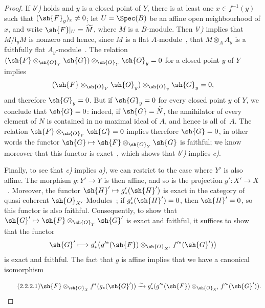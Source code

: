 \begin{proof}
If \emph{b$'$)} holds and $y$ is a closed point of $Y$, there is at least one $x\in f^{-1}(y)$ such that $(\sh{F}_y)_x\neq 0$; let $U=\Spec(B)$ be an affine open neighbourhood of $x$, and write $\sh{F}|_U=\widetilde{M}$, where $M$ is a $B$-module.
Then \emph{b$'$)} implies that $M/\mathfrak{i}_yM$ is nonzero and hence, since $M$ is a flat $A$-module~, that $M\otimes_A A_y$ is a faithfully flat $A_y$-module~.
The relation $(\sh{F}\otimes_{\sh{O}_Y}\sh{G})\otimes_{\sh{O}_Y}\sh{O}_y=0$ for a closed point $y$ of $Y$ implies
\[
  (\sh{F}\otimes_{\sh{O}_Y}\sh{O}_y)\otimes_{\sh{O}_y}\sh{G}_y=0,
\]
and therefore $\sh{G}_y=0$.
But if $\sh{G}_y=0$ for every closed point $y$ of $Y$, we conclude that $\sh{G}=0$: indeed, if $\sh{G}=\widetilde{N}$, the annihilator of every element of $N$ is contained in no maximal ideal of $A$, and hence is all of~$A$.
The relation $\sh{F}\otimes_{\sh{O}_Y}\sh{G}=0$ implies therefore $\sh{G}=0$, in other words the functor $\sh{G}\mapsto\sh{F}\otimes_{\sh{O}_Y}\sh{G}$ is faithful; we know moreover that this functor is exact~, which shows that \emph{b$'$)} implies \emph{c)}.

Finally, to see that \emph{c)} implies \emph{a)}, we can restrict to the case where $Y'$ is also affine.
The morphism $g:Y'\to Y$ is then affine, and so is the projection $g':X'\to X$~.
Moreover, the functor $\sh{H}'\mapsto g'_*(\sh{H}')$ is exact in the category of quasi-coherent $\sh{O}_{X'}$-Modules~; if $g'_*(\sh{H}')=0$, then $\sh{H}'=0$, so this functor is also faithful.
Consequently, to show that $\sh{G}'\mapsto\sh{F}\otimes_{\sh{O}_Y}\sh{G}'$ is exact and faithful, it suffices to show that the functor
\[
  \sh{G}'\longmapsto
  g'_*\bigl(g'^*(\sh{F})\otimes_{\sh{O}_{X'}}f'^*(\sh{G}')\bigr)
\]
is exact and faithful.
The fact that $g$ is affine implies that we have a canonical isomorphism

\begin{equation}
\tag{2.2.2.1}
\label{IV.2.2.2.1}
  \sh{F}\otimes_{\sh{O}_X}f^*(g_*(\sh{G}'))\xrightarrow{\sim} g'_*(g'^*(\sh{F})\otimes_{\sh{O}_{X'}}f'^*(\sh{G}')).
\end{equation}


\end{proof}
